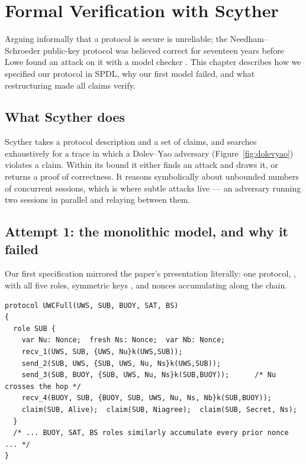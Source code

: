 \chapter{Formal Verification with Scyther}
\label{ch:scyther}

Arguing informally that a protocol is secure is unreliable; the Needham--Schroeder
public-key protocol was believed correct for seventeen years before Lowe found an attack on
it with a model checker \cite{lowe}. This chapter describes how we specified our protocol in
SPDL, why our first model failed, and what restructuring made all claims verify.

\section{What Scyther does}

Scyther \cite{scyther} takes a protocol description and a set of claims, and searches
exhaustively for a trace in which a Dolev--Yao adversary (Figure~\ref{fig:dolevyao})
violates a claim. Within its bound it either finds an attack and draws it, or returns a
proof of correctness. It reasons symbolically about unbounded numbers of concurrent
sessions, which is where subtle attacks live --- an adversary running two sessions in
parallel and relaying between them.

\section{Attempt 1: the monolithic model, and why it failed}

Our first specification mirrored the paper's presentation literally: one protocol,
, with all five roles, symmetric keys , and nonces accumulating
along the chain.

\begin{lstlisting}[style=bad,caption={First attempt (commit \code{82d9b09}, since replaced).
Nonces from earlier hops are carried forward into later ones.}]
protocol UWCFull(UWS, SUB, BUOY, SAT, BS)
{
  role SUB {
    var Nu: Nonce;  fresh Ns: Nonce;  var Nb: Nonce;
    recv_1(UWS, SUB, {UWS, Nu}k(UWS,SUB));
    send_2(SUB, UWS, {SUB, UWS, Nu, Ns}k(UWS,SUB));
    send_3(SUB, BUOY, {SUB, UWS, Nu, Ns}k(SUB,BUOY));      /* Nu crosses the hop */
    recv_4(BUOY, SUB, {BUOY, SUB, UWS, Nu, Ns, Nb}k(SUB,BUOY));
    claim(SUB, Alive);  claim(SUB, Niagree);  claim(SUB, Secret, Ns);
  }
  /* ... BUOY, SAT, BS roles similarly accumulate every prior nonce ... */
}
\end{lstlisting}

